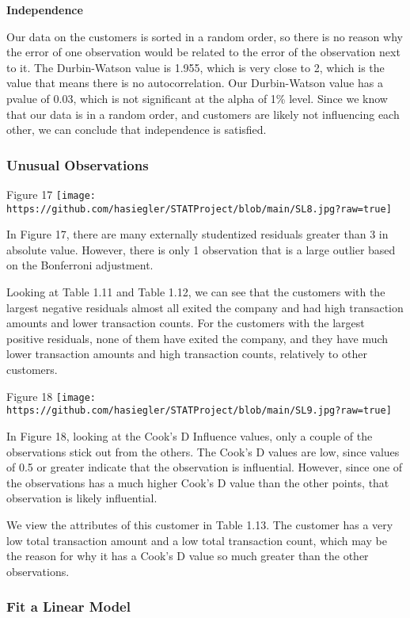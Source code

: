 \documentclass[
]{article}
\begin{document}
\textbf{Independence}

Our data on the customers is sorted in a random order, so there is no
reason why the error of one observation would be related to the error of
the observation next to it. The Durbin-Watson value is 1.955, which is
very close to 2, which is the value that means there is no
autocorrelation. Our Durbin-Watson value has a pvalue of 0.03, which is
not significant at the alpha of 1\% level. Since we know that our data
is in a random order, and customers are likely not influencing each
other, we can conclude that independence is satisfied.

\hypertarget{unusual-observations}{%
\subsubsection{Unusual Observations}\label{unusual-observations}}

Figure 17
\texttt{[image: https://github.com/hasiegler/STATProject/blob/main/SL8.jpg?raw=true]}

In Figure 17, there are many externally studentized residuals greater
than 3 in absolute value. However, there is only 1 observation that is a
large outlier based on the Bonferroni adjustment.

Looking at Table 1.11 and Table 1.12, we can see that the customers with
the largest negative residuals almost all exited the company and had
high transaction amounts and lower transaction counts. For the customers
with the largest positive residuals, none of them have exited the
company, and they have much lower transaction amounts and high
transaction counts, relatively to other customers.

Figure 18
\texttt{[image: https://github.com/hasiegler/STATProject/blob/main/SL9.jpg?raw=true]}

In Figure 18, looking at the Cook's D Influence values, only a couple of
the observations stick out from the others. The Cook's D values are low,
since values of 0.5 or greater indicate that the observation is
influential. However, since one of the observations has a much higher
Cook's D value than the other points, that observation is likely
influential.

We view the attributes of this customer in Table 1.13. The customer has
a very low total transaction amount and a low total transaction count,
which may be the reason for why it has a Cook's D value so much greater
than the other observations.

\hypertarget{fit-a-linear-model}{%
\subsubsection{Fit a Linear Model}\label{fit-a-linear-model}}
\end{document}
